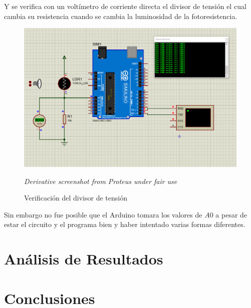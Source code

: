 \documentclass{article}
\begin{document}
Y se verifica con un voltímetro de corriente directa el divisor de tensión el cual cambia su resistencia cuando se cambia la luminosidad de la fotoresistencia.

\begin{figure}[H]
\centering
\includegraphics[width=0.3\paperwidth]{images/sim-2.png}
\caption{Verificación del divisor de tensión}\footnotesize
\textit{Derivative screenshot from Proteus under fair use}
\end{figure}

Sin embargo no fue posible que el Arduino tomara los valores de $A0$ a pesar de estar el circuito y el programa bien y haber intentado varias formas diferentes.

\section{Análisis de Resultados}



\section{Conclusiones}



\printbibliography
\end{document}
